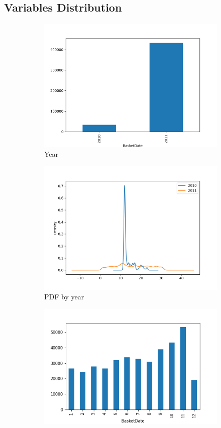 \subsection{Variables Distribution}
\begin{figure}[!h]
\begin{subfigure}{.49\textwidth}
\centering
\includegraphics[width=.7\textwidth]{img/year_bar.png}
\caption{Year}
\label{fig:year_bar}
\end{subfigure}
\begin{subfigure}{.49\textwidth}
\centering
\includegraphics[width=.7\textwidth]{img/year_kde.png}
\caption{PDF by year}
\label{fig:year_kde}
\end{subfigure}
\begin{subfigure}{.33\textwidth}
\centering
\includegraphics[width=.7\textwidth]{img/month_bar.png}

\end{subfigure}
\end{figure}
